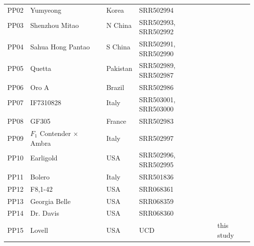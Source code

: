 \documentclass[12pt]{article}
\begin{document}
\begin{center}
\begin{longtable}{lllll}
                 PP02 &Yumyeong &Korea &SRR502994 &\citealt{verde2013high}\\
                 PP03 &Shenzhou Mitao&N China &
		\multirow{2}{1cm}{SRR502993, SRR502992} &\citealt{verde2013high}\\
                 \\
                 PP04 &Sahua Hong Pantao &S China &
		\multirow{2}{1cm}{SRR502991, SRR502990} &\citealt{verde2013high}\\
                 \\
                 PP05 &Quetta &Pakistan &
		\multirow{2}{1cm}{SRR502989, SRR502987} &\citealt{verde2013high}\\
                 \\
                 PP06 &Oro A &Brazil &SRR502986 &\citealt{verde2013high}\\
                 PP07 &IF7310828 &Italy &
		\multirow{2}{1cm}{SRR503001, SRR503000} &\citealt{verde2013high}\\
                 \\
                 PP08 &GF305 &France &SRR502983 &\citealt{verde2013high}\\
                 PP09 &$F_1$ Contender $\times$ Ambra &Italy &SRR502997 &\citealt{verde2013high}\\
                 PP10 &Earligold &USA &
		\multirow{2}{1cm}{SRR502996, SRR502995} &\citealt{verde2013high}\\
                 \\
                 PP11 &Bolero &Italy &SRR501836 &\citealt{verde2013high}\\
                 PP12 &F8,1-42 &USA &SRR068361 &\citealt{ahmad2011whole} \\
                 PP13 &Georgia Belle &USA &SRR068359 &\citealt{ahmad2011whole} \\
                 PP14 &Dr. Davis &USA &SRR068360 &\citealt{ahmad2011whole} \\
                 PP15 &Lovell &USA &UCD &this study\\

\end{longtable}
\end{center}
\end{document}
